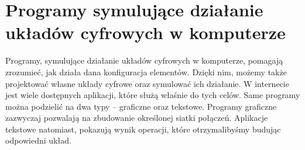 \documentclass[12pt, a4paper, onside, polish]{article}				%
\begin{document}
\setlength\parindent{24pt}

\cleardoublepage

\section{Programy symulujące działanie układów cyfrowych w komputerze}
\hspace{\parindent}
Programy, symulujące działanie układów cyfrowych w komputerze, pomagają zrozumieć, jak działa dana konfiguracja elementów. Dzięki nim, możemy także projektować własne układy cyfrowe oraz symulować ich działanie. W internecie jest wiele dostępnych aplikacji, które służą właśnie do tych celów. Same programy można podzielić na dwa typy – graficzne oraz tekstowe. Programy graficzne zazwyczaj pozwalają na zbudowanie określonej siatki połączeń. Aplikacje tekstowe natomiast, pokazują wynik operacji, które otrzymalibyśmy budując odpowiedni układ.  
\end{document}
